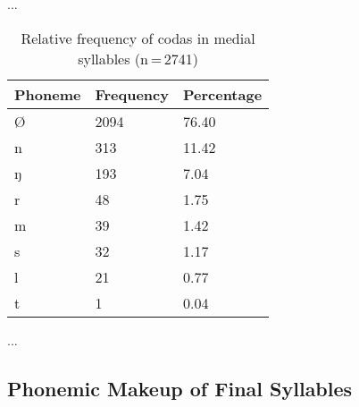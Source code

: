 ...

\begin{table}[hp]\centering
\caption[Relative frequency of codas in medial syllables]{Relative frequency of codas in medial syllables (n\,=\,2741)}
\begin{tabu} to 0.5\textwidth{X X[c] X[c]}
\tableheaderfont\toprule
Phoneme
	& Frequency
	& Percentage
	\\
	
\toprule

Ø	&	2094	&	76.40\pct\\

\midrule

n	&	313	&	11.42\pct\\
ŋ	&	193	&	7.04\pct\\
r	&	48	&	1.75\pct\\
m	&	39	&	1.42\pct\\
s	&	32	&	1.17\pct\\
l	&	21	&	0.77\pct\\
t	&	1	&	0.04\pct\\

\bottomrule
\end{tabu}
\label{tab:midcod}
\end{table}

...

\subsection{Phonemic Makeup of Final Syllables}

